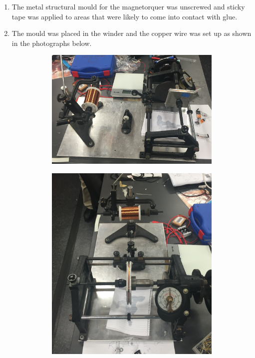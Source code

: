\begin{enumerate}
    \item The metal structural mould for the magnetorquer was unscrewed and sticky tape was applied to areas that were likely to come into contact with glue.
    \item The mould was placed in the winder and the copper wire was set up as shown in the photographs below.
    \begin{center}
        \begin{figure}[H]
            \caption{Magnetorquer Construction Set Up}
            \begin{subfigure}{0.5\textwidth}
                \includegraphics[scale = 0.35]{./figures/Construction_1}
            \end{subfigure}
            \hspace{15mm}
            \begin{subfigure}{0.5\textwidth}
                \includegraphics[scale = 0.35]{./figures/Construction_2}

\end{subfigure}
\end{figure}
\end{center}
\end{enumerate}
